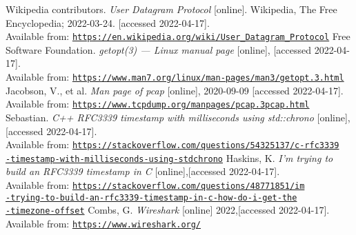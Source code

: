 \documentclass[12pt]{article}
\begin{document}
\begin{thebibliography}{plain}
	 Wikipedia contributors.
	  \emph{User Datagram Protocol} [online]. Wikipedia, The Free Encyclopedia; 2022-03-24. [accessed 2022-04-17]. \\
		Available from: \href{https://en.wikipedia.org/wiki/User\_Datagram\_Protocol}{\texttt{https://en.wikipedia.org/wiki/User\_Datagram\_Protocol}}
	 Free Software Foundation. 
		\emph{getopt(3) — Linux manual page} [online], [accessed 2022-04-17].\\
		Available from: \href{https://www.man7.org/linux/man-pages/man3/getopt.3\\.html}{\texttt{https://www.man7.org/linux/man-pages/man3/getopt.3.html}}
	 Jacobson, V., et al. 
		\emph{Man page of pcap} [online], 2020-09-09 [accessed 2022-04-17].\\
		Available from: \href{https://www.tcpdump.org/manpages/pcap.3pcap.html}{\texttt{https://www.tcpdump.org/manpages/pcap.3pcap.html}}
	 Sebastian. 
		\emph{C++ RFC3339 timestamp with milliseconds using std::chrono} [online], [accessed 2022-04-17].\\
		Available from: \href{https://stackoverflow.com/questions/54325137/c-rfc3339-timestamp-with-milliseconds-using-stdchrono}{\texttt{https://stackoverflow.com/questions/54325137/c-rfc3339\\-timestamp-with-milliseconds-using-stdchrono}}
	 Haskins, K. 
		\emph{I'm trying to build an RFC3339 timestamp in C} [online],[accessed 2022-04-17].\\
		Available from: \href{https://stackoverflow.com/questions/48771851/im-trying-to-build-an-rfc3339-timestamp-in-c-how-do-i-get-the-timezone-offset}{\texttt{https://stackoverflow.com/questions/48771851/im\\-trying-to-build-an-rfc3339-timestamp-in-c-how-do-i-get-the\\-timezone-offset}}
	 Combs, G. 
		\emph{Wireshark} [online] 2022,[accessed 2022-04-17].
		Available from: \href{https://www.wireshark.org/}{\texttt{https://www.wireshark.org/}}

  \end{thebibliography}
\end{document}
